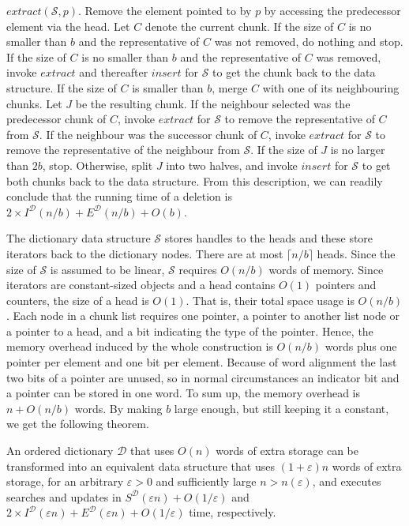 \documentclass{DIKU-article}
\newcommand{\Insert}{\mbox{$\mathit{insert}$}}
\newcommand{\Extract}{\mbox{$\mathit{extract}$}}
\newcommand{\ceils}[1]{\lceil #1 \rceil}
\begin{document}
\Extract{}$(\mathcal{S}, p)$. Remove the element pointed to by $p$ by
accessing the predecessor element via the head. 
Let $C$ denote the current chunk.
  If the size of $C$ is no smaller than $b$ and the representative of
$C$ was not
removed, do nothing and stop. 
  If the size of $C$ is no smaller than $b$ and the representative of
$C$ was removed, invoke \Extract{} and thereafter
\Insert{} for $\mathcal{S}$ to get the chunk back to the data structure.
  If the size of $C$ is smaller than $b$, merge $C$ with one of its
neighbouring chunks. Let $J$ be the resulting chunk. If the neighbour
selected was the predecessor chunk of $C$, invoke \Extract{} for
$\mathcal{S}$ to remove the representative of $C$ from $\mathcal{S}$.
If the neighbour was the successor chunk of $C$, invoke \Extract{} for
$\mathcal{S}$ to remove the representative of the neighbour from
$\mathcal{S}$. If the size of $J$ is
no larger than $2b$, stop. Otherwise, split $J$ into two halves, and
invoke \Insert{} for $\mathcal{S}$ to get both chunks back to the data structure.
From this description, we can readily conclude that the running time
of a deletion is 
$2\times I^{\mathcal{D}}(n/b) + E^{\mathcal{D}}(n/b) + O(b)$.

The dictionary data structure $\mathcal{S}$ stores handles to the heads
and these store iterators back to the dictionary
nodes. There are at most $\ceils{n/b}$ heads. Since the size of
$\mathcal{S}$ is assumed to be linear, $\mathcal{S}$ requires $O(n/b)$
words of memory. Since iterators are constant-sized objects and a head
contains $O(1)$ pointers and counters, the size of a head is
$O(1)$. That is, their total space usage is $O(n/b)$. Each
node in a chunk list requires one pointer, a pointer to another list
node or a pointer to a head, and a bit indicating the type of the
pointer.   Hence, the memory overhead induced by the whole construction is
$O(n/b)$ words plus one pointer per element and one bit per element.
Because of word alignment the last two bits of a pointer are unused,
so in normal circumstances an indicator bit and a pointer can be
stored in one word. To sum up, the memory overhead is $n + O(n/b)$
words. By making $b$ large enough, but still keeping it a constant, we
get the following theorem.

\begin{theorem}
\label{theorem:dictionary}
An ordered dictionary $\mathcal{D}$ that uses $O(n)$ words of extra
storage can be transformed into an equivalent data structure
 that uses $(1+\varepsilon)n$ words of extra storage,
for an arbitrary $\varepsilon > 0$ and sufficiently large $n >
n(\varepsilon)$, and executes searches and updates in
$S^{\mathcal{D}}(\varepsilon n) + O(1/\varepsilon)$ and $2\times
I^{\mathcal{D}}(\varepsilon n) + E^{\mathcal{D}}(\varepsilon n) +
O(1/\varepsilon)$ time, respectively.
\end{theorem}
\end{document}
